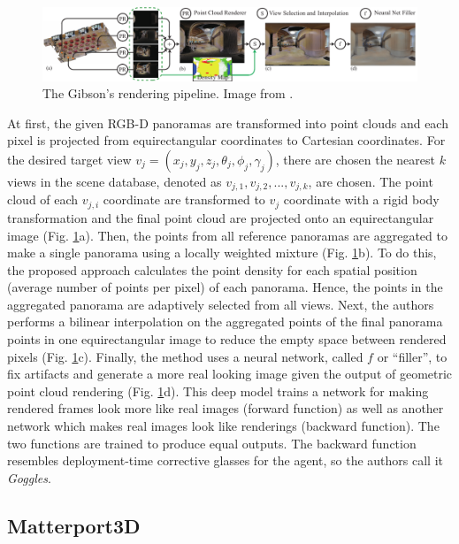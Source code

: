 \begin{figure}[h!]
	\centering
	\includegraphics[width=\linewidth]{images/gibson_rendering_pipeline.pdf}
	\caption{The Gibson's rendering pipeline. Image from \cite{gibson}.}
	\label{fig:gibsonrenderingpipeline}
\end{figure}
At first, the given RGB-D panoramas are transformed into point clouds and each pixel is projected from equirectangular coordinates to Cartesian coordinates. For the desired target view $v_j =
(x_j , y_j , z_j , \theta_j, \phi_j, \gamma_j )$, there are chosen the nearest $k$ views in the
scene database, denoted as $v_{j,1}, v_{j,2}, ..., v_{j,k}$, are chosen. The point cloud of each $v_{j,i}$ coordinate are transformed to $v_j$ coordinate with a rigid body transformation and the final point cloud are projected onto an equirectangular image (Fig. \ref{fig:gibsonrenderingpipeline}a). Then, the points from all reference panoramas are aggregated to make a single panorama using a locally weighted mixture (Fig. \ref{fig:gibsonrenderingpipeline}b). To do this, the proposed approach calculates the point density for each spatial position (average number of points per pixel) of each panorama. Hence, the points in the aggregated panorama are adaptively selected from all views. Next, the authors performs a bilinear interpolation on the aggregated points of the final panorama
points in one equirectangular image to reduce the empty space between rendered pixels (Fig. \ref{fig:gibsonrenderingpipeline}c). Finally, the method uses a neural network, called $f$ or ``filler'', to fix artifacts and generate a more real looking image given the output of geometric point cloud rendering (Fig. \ref{fig:gibsonrenderingpipeline}d). This deep model trains a network for making rendered frames look more like real images (forward function) as well as another network which makes real images look like renderings (backward function). The two functions are trained to produce equal outputs. The backward function resembles deployment-time corrective
glasses for the agent, so the authors call it \textit{Goggles}.

\subsection{Matterport3D}

